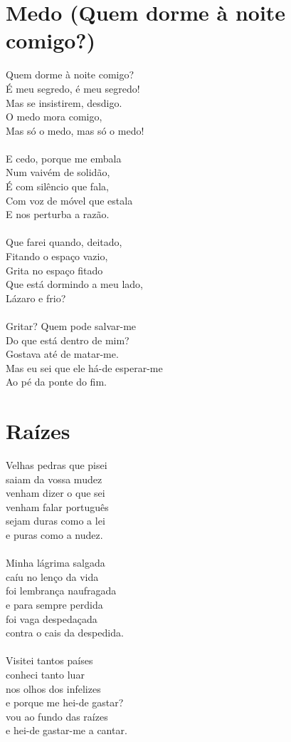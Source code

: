 \documentclass{article}
\begin{document}
\section{ Medo (Quem dorme à noite comigo?)}
Quem dorme à noite comigo?\\
É meu segredo, é meu segredo!\\
Mas se insistirem, desdigo.\\
O medo mora comigo,\\
Mas só o medo, mas só o medo!\\
\\
E cedo, porque me embala\\
Num vaivém de solidão,\\
É com silêncio que fala,\\
Com voz de móvel que estala\\
E nos perturba a razão.\\
\\
Que farei quando, deitado,\\
Fitando o espaço vazio,\\
Grita no espaço fitado\\
Que está dormindo a meu lado,\\
Lázaro e frio?\\
\\
Gritar? Quem pode salvar-me\\
Do que está dentro de mim?\\
Gostava até de matar-me.\\
Mas eu sei que ele há-de esperar-me\\
Ao pé da ponte do fim.\\
\section{ Raízes}
Velhas pedras que pisei\\
saiam da vossa mudez\\
venham dizer o que sei\\
venham falar português\\
sejam duras como a lei\\
e puras como a nudez.\\
\\
Minha lágrima salgada\\
caíu no lenço da vida\\
foi lembrança naufragada\\
e para sempre perdida\\
foi vaga despedaçada\\
contra o cais da despedida.\\
\\
Visitei tantos países\\
conheci tanto luar\\
nos olhos dos infelizes\\
e porque me hei-de gastar?\\
vou ao fundo das raízes \\
e hei-de gastar-me a cantar.\\
\end{document}
